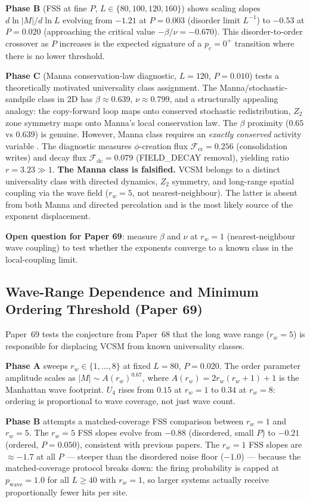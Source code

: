 \documentclass[11pt]{article}
\begin{document}
\textbf{Phase B} (FSS at fine $P$, $L\in\{80,100,120,160\}$)
shows scaling slopes $d\ln|M|/d\ln L$ evolving from $-1.21$ at $P=0.003$
(disorder limit $L^{-1}$) to $-0.53$ at $P=0.020$ (approaching the critical
value $-\beta/\nu=-0.670$).
This disorder-to-order crossover as $P$ increases is the expected signature of
a $p_c=0^+$ transition where there is no lower threshold.

\textbf{Phase C} (Manna conservation-law diagnostic, $L=120$, $P=0.010$) tests
a theoretically motivated universality class assignment.
The Manna/stochastic-sandpile class in 2D has $\beta\approx0.639$,
$\nu\approx0.799$, and a structurally appealing analogy: the copy-forward loop
maps onto conserved stochastic redistribution, $Z_2$ zone symmetry maps onto
Manna's local conservation law.
The $\beta$ proximity ($0.65$ vs $0.639$) is genuine.
However, Manna class requires an \emph{exactly conserved} activity variable
\citep{Vespignani1998}.
The diagnostic measures $\phi$-creation flux $\mathcal{F}_\mathrm{cr}=0.256$
(consolidation writes) and decay flux $\mathcal{F}_\mathrm{dc}=0.079$
(FIELD\_DECAY removal), yielding ratio $r=3.23\gg1$.
\textbf{The Manna class is falsified.}
VCSM belongs to a distinct universality class with directed dynamics,
$Z_2$ symmetry, and long-range spatial coupling via the wave field ($r_w=5$,
not nearest-neighbour).
The latter is absent from both Manna and directed percolation and is the
most likely source of the exponent displacement.

\textbf{Open question for Paper 69}: measure $\beta$ and $\nu$ at $r_w=1$
(nearest-neighbour wave coupling) to test whether the exponents converge
to a known class in the local-coupling limit.

\subsection{Wave-Range Dependence and Minimum Ordering Threshold (Paper 69)}

Paper~69 tests the conjecture from Paper~68 that the long wave range ($r_w=5$)
is responsible for displacing VCSM from known universality classes.

\textbf{Phase A} sweeps $r_w\in\{1,\ldots,8\}$ at fixed $L=80$, $P=0.020$.
The order parameter amplitude scales as $|M|\sim A(r_w)^{0.67}$, where
$A(r_w)=2r_w(r_w+1)+1$ is the Manhattan wave footprint.
$U_4$ rises from $0.15$ at $r_w=1$ to $0.34$ at $r_w=8$: ordering is
proportional to wave coverage, not just wave count.

\textbf{Phase B} attempts a matched-coverage FSS comparison between $r_w=1$ and $r_w=5$.
The $r_w=5$ FSS slopes evolve from $-0.88$ (disordered, small $P$) to $-0.21$
(ordered, $P=0.050$), consistent with previous papers.
The $r_w=1$ FSS slopes are $\approx-1.7$ at all $P$ --- steeper than the
disordered noise floor ($-1.0$) --- because the matched-coverage protocol breaks
down: the firing probability is capped at $p_\mathrm{wave}=1.0$ for all $L\geq40$
with $r_w=1$, so larger systems actually receive proportionally fewer hits per site.
\end{document}
